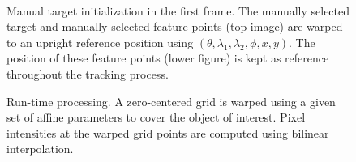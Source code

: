 \begin{Body}
								\begin{figure}[t]
								\centering
								\\
								\caption{Manual target initialization in the first frame.  The manually selected target and manually selected feature points (top image) are warped to an upright reference position using $(\theta, \lambda_1, \lambda_2, \phi, x, y)$.  The position of these feature points (lower figure) is kept as reference throughout the tracking process.}
								\label{Fig:affine_frame_1}
								\end{figure}

								\begin{figure}[t]
								\centering
								\caption{Run-time processing.  A zero-centered grid is warped using a given set of affine parameters to cover the object of interest.  Pixel intensities at the warped grid points are computed using bilinear interpolation.}
								\label{Fig:affine_runtime}
								\end{figure}


\end{Body}
